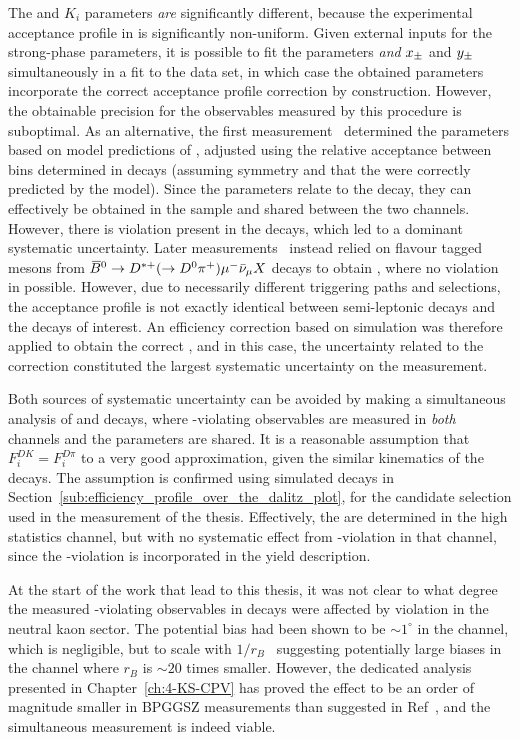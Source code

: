 The \Fi and $K_i$ parameters \emph{are} significantly different, because the experimental acceptance profile in \lhcb is significantly non-uniform.  Given external inputs for the strong-phase parameters, it is possible to fit the \Fi parameters \emph{and} $x_\pm$ and $y_\pm$ simultaneously in a fit to the \lhcb \BtoDK data set, in which case the obtained \Fi parameters incorporate the correct acceptance profile correction by construction. However, the obtainable precision for the \CP observables measured by this procedure is suboptimal. As an alternative, the first \lhcb measurement~\cite{LHCb-PAPER-2012-027} determined the \Fi parameters based on model predictions of \Ki, adjusted using the relative acceptance between bins determined in \BtoDpi decays (assuming \CP symmetry and that the \Ki were correctly predicted by the model). Since the \Fi parameters relate to the \D decay, they can effectively be obtained in the \Dpi sample  and shared between the two \BtoDh channels. However, there is \CP violation present in the \BtoDpi decays, which led to a dominant systematic uncertainty. Later \lhcb measurements~\cite{LHCb-PAPER-2014-041,LHCb-PAPER-2018-017} instead relied on flavour tagged \D mesons from ${{\kern 0.18em\overline{\kern -0.18em B}}{}^0}\rightarrow{\ensuremath{{D}^{*+}}}(\rightarrow {\ensuremath{{D}^0}} {\ensuremath{{\pi}^+}})\mu^- \bar \nu_\mu X$ decays to obtain \Fi, where no \CP violation in possible. However, due to necessarily different triggering paths and selections, the acceptance profile is not exactly identical between semi-leptonic decays and the \BtoDh decays of interest. An efficiency correction based on simulation was therefore applied to obtain the correct \Fi, and in this case,  the uncertainty related to the correction constituted the largest systematic uncertainty on the measurement.

Both sources of systematic uncertainty can be avoided by making a simultaneous analysis of \BtoDK and \BtoDpi decays, where \CP-violating observables are measured in \emph{both} channels and the \Fi parameters are shared. It is a reasonable assumption that $F_i^{DK}=F_i^{D\pi}$ to a very good approximation, given the similar kinematics of the decays. The assumption is confirmed using simulated decays in Section~\ref{sub:efficiency_profile_over_the_dalitz_plot}, for the candidate selection used in the measurement of the thesis. Effectively, the \Fi are determined in the high statistics \BtoDpi channel, but with no systematic effect from \CP-violation in that channel, since the \CP-violation is incorporated in the yield description. 

At the start of the work that lead to this thesis, it was not clear to what degree the measured \CP-violating observables in \BtoDpi decays were affected by \CP violation in the neutral kaon sector. The potential bias had been shown to be $\sim1^\circ$ in the \BtoDK channel, which is negligible, but to scale with $1/r_B$~\cite{grossmanEffectsBarMixing2014} suggesting potentially large biases in the \BtoDpi channel where $r_B$ is $\sim20$ times smaller. However, the dedicated analysis presented in Chapter~\ref{ch:4-KS-CPV} has proved the effect to be an order of magnitude smaller in BPGGSZ measurements than suggested in Ref~\cite{grossmanEffectsBarMixing2014}, and the simultaneous measurement is indeed viable. 

